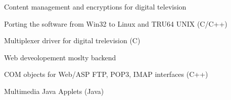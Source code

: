 \documentclass[a4paper]{deedy-resume} %
\begin{document}
\begin{minipage}[t]{0.66\textwidth}
\sectionspace %


	Content management and encryptions for digital television
	\begin{tightitemize}
		\item Porting the software from Win32 to Linux and TRU64 UNIX (C/C++)
		\item Multiplexer driver for digital trelevision (C)
	\end{tightitemize}

\sectionspace %


	Web deveolopement moslty backend
	\begin{tightitemize}
		\item COM objects for Web/ASP FTP, POP3, IMAP interfaces (C++)
		\item Multimedia Java Applets (Java)
	\end{tightitemize}

\sectionspace %

\end{minipage}%
\hfill


\newpage %
\bigskip
\end{document}

